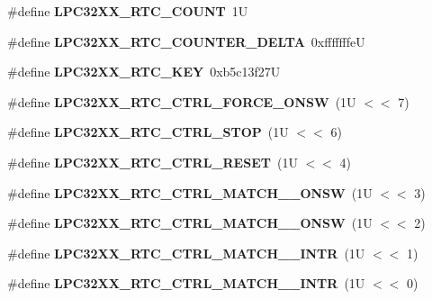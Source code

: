 \begin{DoxyCompactItemize}
\item 
\mbox{\label{arm_2lpc32xx_2rtc_2rtc-config_8c_a49e6cebe52890f495c45bcbb4064d5f8}} 
\#define {\bfseries L\+P\+C32\+X\+X\+\_\+\+R\+T\+C\+\_\+\+C\+O\+U\+NT}~1U
\item 
\mbox{\label{arm_2lpc32xx_2rtc_2rtc-config_8c_a3d6628d535795929ef6c00c010cb94a0}} 
\#define {\bfseries L\+P\+C32\+X\+X\+\_\+\+R\+T\+C\+\_\+\+C\+O\+U\+N\+T\+E\+R\+\_\+\+D\+E\+L\+TA}~0xfffffffeU
\item 
\mbox{\label{arm_2lpc32xx_2rtc_2rtc-config_8c_a19015e319778d672278b6cc1ad2ac7fd}} 
\#define {\bfseries L\+P\+C32\+X\+X\+\_\+\+R\+T\+C\+\_\+\+K\+EY}~0xb5c13f27U
\item 
\mbox{\label{arm_2lpc32xx_2rtc_2rtc-config_8c_abbd2308d7d92bbfcc89252f50dd2bc2b}} 
\#define {\bfseries L\+P\+C32\+X\+X\+\_\+\+R\+T\+C\+\_\+\+C\+T\+R\+L\+\_\+\+F\+O\+R\+C\+E\+\_\+\+O\+N\+SW}~(1\+U $<$$<$ 7)
\item 
\mbox{\label{arm_2lpc32xx_2rtc_2rtc-config_8c_a339e4520f4963e9cd16cb694b9a5289a}} 
\#define {\bfseries L\+P\+C32\+X\+X\+\_\+\+R\+T\+C\+\_\+\+C\+T\+R\+L\+\_\+\+S\+T\+OP}~(1\+U $<$$<$ 6)
\item 
\mbox{\label{arm_2lpc32xx_2rtc_2rtc-config_8c_a2afa5f9731871549a3ef392866caad59}} 
\#define {\bfseries L\+P\+C32\+X\+X\+\_\+\+R\+T\+C\+\_\+\+C\+T\+R\+L\+\_\+\+R\+E\+S\+ET}~(1\+U $<$$<$ 4)
\item 
\mbox{\label{arm_2lpc32xx_2rtc_2rtc-config_8c_aa77b1920f28b6f0cbb0504ec3e4136e3}} 
\#define {\bfseries L\+P\+C32\+X\+X\+\_\+\+R\+T\+C\+\_\+\+C\+T\+R\+L\+\_\+\+M\+A\+T\+C\+H\+\_\+\_\+\+O\+N\+SW}~(1\+U $<$$<$ 3)
\item 
\mbox{\label{arm_2lpc32xx_2rtc_2rtc-config_8c_a482a496a0d76063165e4e13b647d5da4}} 
\#define {\bfseries L\+P\+C32\+X\+X\+\_\+\+R\+T\+C\+\_\+\+C\+T\+R\+L\+\_\+\+M\+A\+T\+C\+H\+\_\+\_\+\+O\+N\+SW}~(1\+U $<$$<$ 2)
\item 
\mbox{\label{arm_2lpc32xx_2rtc_2rtc-config_8c_ae51e12741c7391902a0274229570b446}} 
\#define {\bfseries L\+P\+C32\+X\+X\+\_\+\+R\+T\+C\+\_\+\+C\+T\+R\+L\+\_\+\+M\+A\+T\+C\+H\+\_\+\_\+\+I\+N\+TR}~(1\+U $<$$<$ 1)
\item 
\mbox{\label{arm_2lpc32xx_2rtc_2rtc-config_8c_ac152e397b8c4fd88dce93aa531cb35e6}} 
\#define {\bfseries L\+P\+C32\+X\+X\+\_\+\+R\+T\+C\+\_\+\+C\+T\+R\+L\+\_\+\+M\+A\+T\+C\+H\+\_\+\_\+\+I\+N\+TR}~(1\+U $<$$<$ 0)
\end{DoxyCompactItemize}
